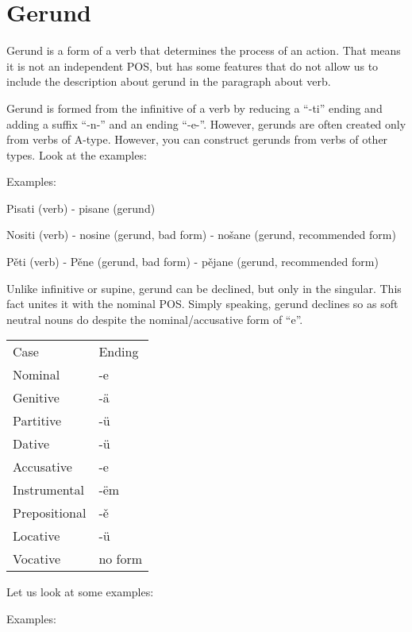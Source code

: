 \section{Gerund}

Gerund is a form of a verb that determines the process of an action. That means it is not an independent POS, but has some features that do not allow us to include the description about gerund in the paragraph about verb.

Gerund is formed from the infinitive of a verb by reducing a “-ti” ending and adding a suffix “-n-” and an ending “-e-”. However, gerunds are often created only from verbs of A-type. However, you can construct gerunds from verbs of other types. Look at the examples:

Examples:

Pisati (verb) - pisane (gerund)

Nositi (verb) - nosine (gerund, bad form) - nošane (gerund, recommended form)

Pěti (verb) - Pěne (gerund, bad form) - pějane (gerund, recommended form)

Unlike infinitive or supine, gerund can be declined, but only in the singular. This fact unites it with the nominal POS. Simply speaking, gerund declines so as soft neutral nouns do despite the nominal/accusative form of “e”.

\begin{table}
	\begin{tabular}{ll}
	Case & Ending \\
	Nominal & -e \\
	Genitive & -ä \\
	Partitive & -ü \\
	Dative & -ü \\
	Accusative & -e \\
	Instrumental & -ëm \\
	Prepositional & -ě \\
	Locative & -ü \\
	Vocative & no form
	\end{tabular}
\end{table}

Let us look at some examples:

Examples:


